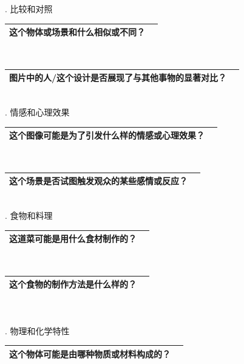 \documentclass[12pt]{book}
\begin{document}
. 比较和对照

\begin{tabular}{|p{15cm}|p{3cm}|}
	\hline
这个物体或场景和什么相似或不同？\\
	\hline
\end{tabular}\\



\begin{tabular}{|p{15cm}|p{3cm}|}
	\hline
	图片中的人/这个设计是否展现了与其他事物的显著对比？\\
	\hline
\end{tabular}\\



. 情感和心理效果

\begin{tabular}{|p{15cm}|p{3cm}|}
	\hline
这个图像可能是为了引发什么样的情感或心理效果？\\
	\hline
\end{tabular}\\


\begin{tabular}{|p{15cm}|p{3cm}|}
	\hline
这个场景是否试图触发观众的某些感情或反应？\\
	\hline
\end{tabular}\\

. 食物和料理

\begin{tabular}{|p{15cm}|p{3cm}|}
	\hline
这道菜可能是用什么食材制作的？\\
	\hline
\end{tabular}\\


\begin{tabular}{|p{15cm}|p{3cm}|}
	\hline
这个食物的制作方法是什么样的？\\
	\hline
\end{tabular}\\\\



. 物理和化学特性

\begin{tabular}{|p{15cm}|p{3cm}|}
	\hline
这个物体可能是由哪种物质或材料构成的？\\
	\hline
\end{tabular}\\
\end{document}
